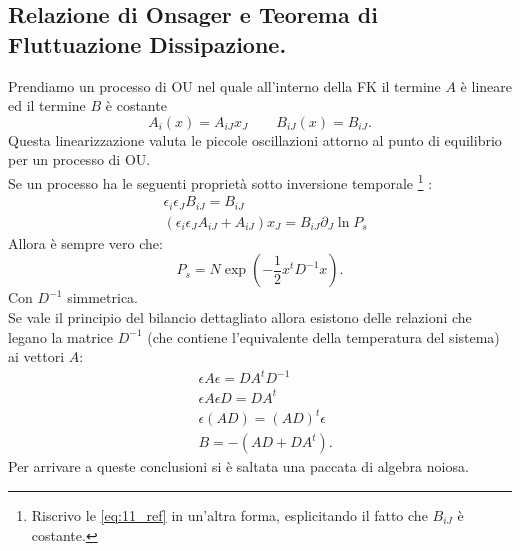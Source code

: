\subsection{Relazione di Onsager e Teorema di Fluttuazione Dissipazione.}%
\label{sub:Relazione di Onsager e Teorema di Fluttuazione Dissipazione.}
Prendiamo un processo di OU nel quale all'interno della FK il termine $A$ è lineare ed il termine $B$ è costante
\[
    A_i(x) = A_{iJ}x_J \qquad
    B_{iJ}(x) = B_{iJ}
.\] 
Questa linearizzazione valuta le piccole oscillazioni attorno al punto di equilibrio per un processo di OU.\\
Se un processo ha le seguenti proprietà sotto inversione temporale
\footnote{Riscrivo le \ref{eq:11_ref} in un'altra forma, esplicitando il fatto che $B_{iJ}$ è costante.}
:
\begin{equation}
\begin{aligned}
    &\epsilon_i\epsilon_J B_{iJ}=B_{iJ}\\
    &\left(\epsilon_i\epsilon_JA_{iJ} + A_{iJ}\right)x_J = B_{iJ}\partial_{J}\ln P_s \label{eq:11_B}
\end{aligned}
\end{equation}
Allora è sempre vero che:
\[
    P_s = N \exp\left(-\frac{1}{2}x^tD^{-1}x\right)
.\] 
Con $D^{-1}$ simmetrica.\\
Se vale il principio del bilancio dettagliato allora esistono delle relazioni che legano la matrice $D^{-1}$ (che contiene l'equivalente della temperatura del sistema) ai vettori $A$:
\begin{equation}
\begin{aligned}
    &\epsilon A\epsilon  = D A^tD^{-1} \\
    &\epsilon A\epsilon D = D A^t \\
    &\epsilon (AD) = (AD)^t\epsilon\\
    & B = -\left(AD + DA^t\right) \label{eq:11_B1}
.\end{aligned}
\end{equation}
Per arrivare a queste conclusioni si è saltata una paccata di algebra noiosa.
